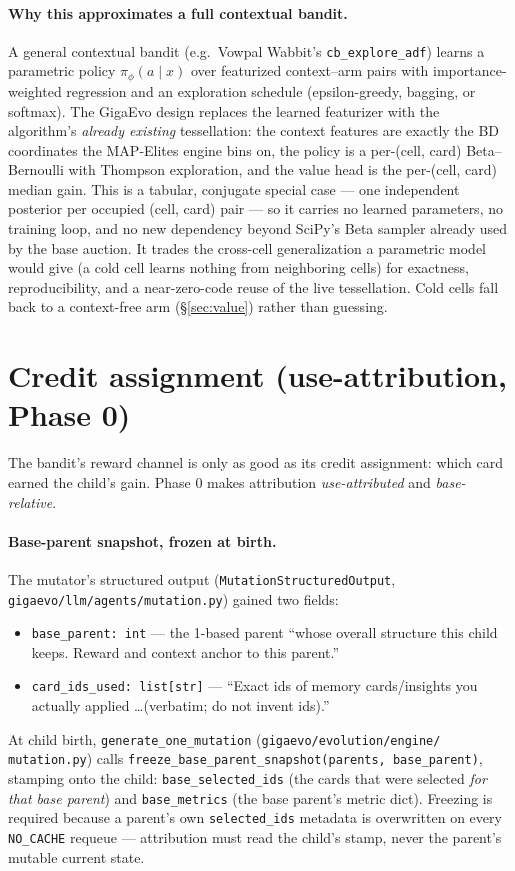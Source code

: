 \documentclass[11pt]{article}
\newcommand{\code}[1]{\texttt{#1}}
\begin{document}
\paragraph{Why this approximates a full contextual bandit.} A general contextual
bandit (e.g.\ Vowpal Wabbit's \code{cb\_explore\_adf}) learns a parametric policy
$\pi_\phi(a\mid x)$ over featurized context--arm pairs with importance-weighted
regression and an exploration schedule (epsilon-greedy, bagging, or softmax). The
GigaEvo design replaces the learned featurizer with the algorithm's \emph{already
existing} tessellation: the context features are exactly the BD coordinates the
MAP-Elites engine bins on, the policy is a per-(cell, card) Beta--Bernoulli with
Thompson exploration, and the value head is the per-(cell, card) median gain. This
is a tabular, conjugate special case --- one independent posterior per occupied
(cell, card) pair --- so it carries no learned parameters, no training loop, and
no new dependency beyond SciPy's Beta sampler already used by the base auction.
It trades the cross-cell generalization a parametric model would give (a cold cell
learns nothing from neighboring cells) for exactness, reproducibility, and a
near-zero-code reuse of the live tessellation. Cold cells fall back to a
context-free arm (\S\ref{sec:value}) rather than guessing.

\section{Credit assignment (use-attribution, Phase 0)}
\label{sec:credit}

The bandit's reward channel is only as good as its credit assignment: which card
earned the child's gain. Phase 0 makes attribution \emph{use-attributed} and
\emph{base-relative}.

\paragraph{Base-parent snapshot, frozen at birth.} The mutator's structured
output (\code{MutationStructuredOutput}, \code{gigaevo/llm/agents/mutation.py})
gained two fields:
\begin{itemize}[leftmargin=2em,itemsep=1pt]
\item \code{base\_parent: int} --- the 1-based parent ``whose overall structure
this child keeps. Reward and context anchor to this parent.''
\item \code{card\_ids\_used: list[str]} --- ``Exact ids of memory cards/insights
you actually applied \ldots (verbatim; do not invent ids).''
\end{itemize}
At child birth, \code{generate\_one\_mutation} (\code{gigaevo/evolution/engine/
mutation.py}) calls \code{freeze\_base\_parent\_snapshot(parents, base\_parent)},
stamping onto the child: \code{base\_selected\_ids} (the cards that were selected
\emph{for that base parent}) and \code{base\_metrics} (the base parent's metric
dict). Freezing is required because a parent's own \code{selected\_ids} metadata
is overwritten on every \code{NO\_CACHE} requeue --- attribution must read the
child's stamp, never the parent's mutable current state.
\end{document}
